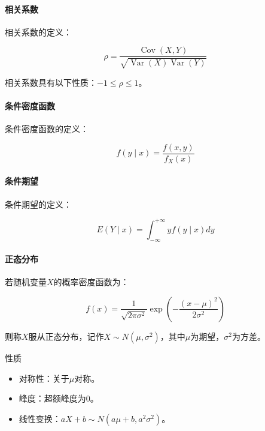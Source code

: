 \paragraph*{相关系数}
\begin{flushleft}
相关系数的定义：
\end{flushleft}
\begin{equation}
\rho = \frac{\operatorname{Cov}(X,Y)}{\sqrt{\operatorname{Var}(X)\operatorname{Var}(Y)}}
\end{equation}

\begin{flushleft}
相关系数具有以下性质：$-1 \leqslant \rho \leqslant 1$。
\end{flushleft}
\paragraph*{条件密度函数}
\begin{flushleft}
条件密度函数的定义：
\end{flushleft}
\begin{equation}
f(y \mid x) = \frac{f(x,y)}{f_X(x)}
\end{equation}

\paragraph*{条件期望}
\begin{flushleft}
条件期望的定义：
\end{flushleft}
\begin{equation}
E(Y \mid x) = \int_{-\infty}^{+\infty} y f(y \mid x) dy
\end{equation}

\paragraph*{正态分布}

\begin{flushleft}
若随机变量$X$的概率密度函数为：
\end{flushleft}
\begin{equation}
f(x) = \frac{1}{\sqrt{2\pi\sigma^2}} \exp\left(-\frac{(x-\mu)^2}{2\sigma^2}\right)
\end{equation}

\begin{flushleft}
则称$X$服从正态分布，记作$X \sim N(\mu, \sigma^2)$，其中$\mu$为期望，$\sigma^2$为方差。
\end{flushleft}
\begin{flushleft}
性质
\end{flushleft}
\begin{itemize}
	\item 对称性：关于$\mu$对称。
	\item 峰度：超额峰度为0。
	\item 线性变换：$aX+b \sim N(a\mu+b, a^2\sigma^2)$。
\end{itemize}

